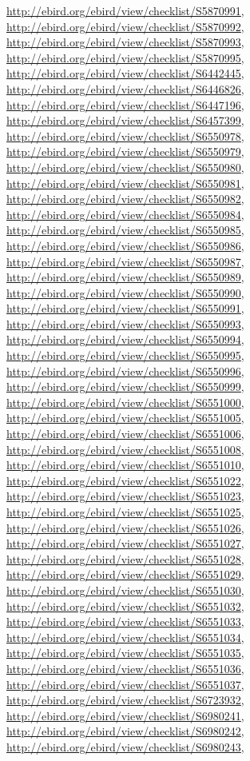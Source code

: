 \documentclass[9pt, article]{memoir}
\begin{document}
\begin{multicols}{2}
\url{http://ebird.org/ebird/view/checklist/S5870991}, 
\url{http://ebird.org/ebird/view/checklist/S5870992}, 
\url{http://ebird.org/ebird/view/checklist/S5870993}, 
\url{http://ebird.org/ebird/view/checklist/S5870995}, 
\url{http://ebird.org/ebird/view/checklist/S6442445}, 
\url{http://ebird.org/ebird/view/checklist/S6446826}, 
\url{http://ebird.org/ebird/view/checklist/S6447196}, 
\url{http://ebird.org/ebird/view/checklist/S6457399}, 
\url{http://ebird.org/ebird/view/checklist/S6550978}, 
\url{http://ebird.org/ebird/view/checklist/S6550979}, 
\url{http://ebird.org/ebird/view/checklist/S6550980}, 
\url{http://ebird.org/ebird/view/checklist/S6550981}, 
\url{http://ebird.org/ebird/view/checklist/S6550982}, 
\url{http://ebird.org/ebird/view/checklist/S6550984}, 
\url{http://ebird.org/ebird/view/checklist/S6550985}, 
\url{http://ebird.org/ebird/view/checklist/S6550986}, 
\url{http://ebird.org/ebird/view/checklist/S6550987}, 
\url{http://ebird.org/ebird/view/checklist/S6550989}, 
\url{http://ebird.org/ebird/view/checklist/S6550990}, 
\url{http://ebird.org/ebird/view/checklist/S6550991}, 
\url{http://ebird.org/ebird/view/checklist/S6550993}, 
\url{http://ebird.org/ebird/view/checklist/S6550994}, 
\url{http://ebird.org/ebird/view/checklist/S6550995}, 
\url{http://ebird.org/ebird/view/checklist/S6550996}, 
\url{http://ebird.org/ebird/view/checklist/S6550999}, 
\url{http://ebird.org/ebird/view/checklist/S6551000}, 
\url{http://ebird.org/ebird/view/checklist/S6551005}, 
\url{http://ebird.org/ebird/view/checklist/S6551006}, 
\url{http://ebird.org/ebird/view/checklist/S6551008}, 
\url{http://ebird.org/ebird/view/checklist/S6551010}, 
\url{http://ebird.org/ebird/view/checklist/S6551022}, 
\url{http://ebird.org/ebird/view/checklist/S6551023}, 
\url{http://ebird.org/ebird/view/checklist/S6551025}, 
\url{http://ebird.org/ebird/view/checklist/S6551026}, 
\url{http://ebird.org/ebird/view/checklist/S6551027}, 
\url{http://ebird.org/ebird/view/checklist/S6551028}, 
\url{http://ebird.org/ebird/view/checklist/S6551029}, 
\url{http://ebird.org/ebird/view/checklist/S6551030}, 
\url{http://ebird.org/ebird/view/checklist/S6551032}, 
\url{http://ebird.org/ebird/view/checklist/S6551033}, 
\url{http://ebird.org/ebird/view/checklist/S6551034}, 
\url{http://ebird.org/ebird/view/checklist/S6551035}, 
\url{http://ebird.org/ebird/view/checklist/S6551036}, 
\url{http://ebird.org/ebird/view/checklist/S6551037}, 
\url{http://ebird.org/ebird/view/checklist/S6723932}, 
\url{http://ebird.org/ebird/view/checklist/S6980241}, 
\url{http://ebird.org/ebird/view/checklist/S6980242}, 
\url{http://ebird.org/ebird/view/checklist/S6980243}, 

\end{multicols}
\end{document}
